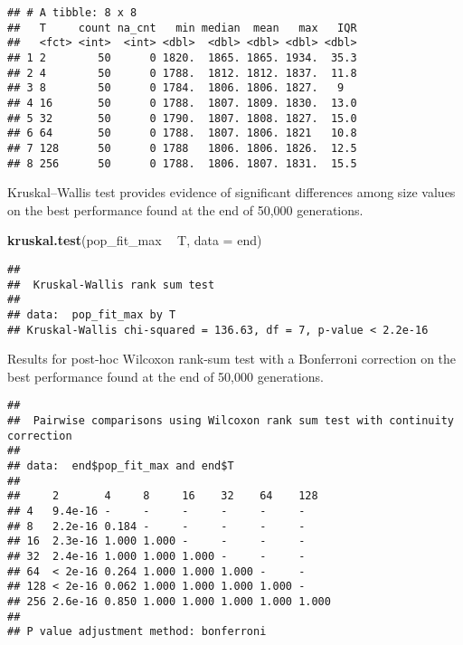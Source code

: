 \documentclass[]{book}
\newenvironment{Shaded}{\begin{snugshade}}{\end{snugshade}}
\newcommand{\DataTypeTok}[1]{\textcolor[rgb]{0.13,0.29,0.53}{#1}}
\newcommand{\KeywordTok}[1]{\textcolor[rgb]{0.13,0.29,0.53}{\textbf{#1}}}
\newcommand{\NormalTok}[1]{#1}
\newcommand{\OperatorTok}[1]{\textcolor[rgb]{0.81,0.36,0.00}{\textbf{#1}}}
\newcommand{\OtherTok}[1]{\textcolor[rgb]{0.56,0.35,0.01}{#1}}
\newcommand{\StringTok}[1]{\textcolor[rgb]{0.31,0.60,0.02}{#1}}
\begin{document}
\begin{verbatim}
## # A tibble: 8 x 8
##   T     count na_cnt   min median  mean   max   IQR
##   <fct> <int>  <int> <dbl>  <dbl> <dbl> <dbl> <dbl>
## 1 2        50      0 1820.  1865. 1865. 1934.  35.3
## 2 4        50      0 1788.  1812. 1812. 1837.  11.8
## 3 8        50      0 1784.  1806. 1806. 1827.   9  
## 4 16       50      0 1788.  1807. 1809. 1830.  13.0
## 5 32       50      0 1790.  1807. 1808. 1827.  15.0
## 6 64       50      0 1788.  1807. 1806. 1821   10.8
## 7 128      50      0 1788   1806. 1806. 1826.  12.5
## 8 256      50      0 1788.  1806. 1807. 1831.  15.5
\end{verbatim}

Kruskal--Wallis test provides evidence of significant differences among size values on the best performance found at the end of 50,000 generations.

\begin{Shaded}
\begin{Highlighting}[]
\KeywordTok{kruskal.test}\NormalTok{(pop_fit_max }\OperatorTok{~}\StringTok{ }\NormalTok{T, }\DataTypeTok{data =}\NormalTok{ end)}
\end{Highlighting}
\end{Shaded}

\begin{verbatim}
## 
##  Kruskal-Wallis rank sum test
## 
## data:  pop_fit_max by T
## Kruskal-Wallis chi-squared = 136.63, df = 7, p-value < 2.2e-16
\end{verbatim}

Results for post-hoc Wilcoxon rank-sum test with a Bonferroni correction on the best performance found at the end of 50,000 generations.

\begin{Shaded}
\end{Shaded}

\begin{verbatim}
## 
##  Pairwise comparisons using Wilcoxon rank sum test with continuity correction 
## 
## data:  end$pop_fit_max and end$T 
## 
##     2       4     8     16    32    64    128  
## 4   9.4e-16 -     -     -     -     -     -    
## 8   2.2e-16 0.184 -     -     -     -     -    
## 16  2.3e-16 1.000 1.000 -     -     -     -    
## 32  2.4e-16 1.000 1.000 1.000 -     -     -    
## 64  < 2e-16 0.264 1.000 1.000 1.000 -     -    
## 128 < 2e-16 0.062 1.000 1.000 1.000 1.000 -    
## 256 2.6e-16 0.850 1.000 1.000 1.000 1.000 1.000
## 
## P value adjustment method: bonferroni
\end{verbatim}
\end{document}
